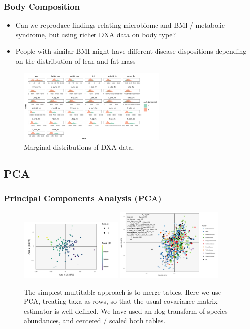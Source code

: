 \documentclass{beamer}
\begin{document}
\begin{frame}
  \frametitle{Body Composition}
  \begin{itemize}
  \item Can we reproduce findings relating microbiome and BMI / metabolic
    syndrome, but using richer DXA data on body type?
  \item People with similar BMI might have different disease dispositions
    depending on the distribution of lean and fat mass
  \end{itemize}
\begin{figure}[ht]
  \centering
  \includegraphics[width=0.65\textwidth]{figure/bc_histo}
  \caption{Marginal distributions of DXA data. \label{fig:bc_histo} }
\end{figure}
\end{frame}
\subsection{PCA}
\label{subsec:pca}

\begin{frame}
  \frametitle{Principal Components Analysis (PCA)}
  \begin{figure}[ht]
    \centering
    \includegraphics[width=0.45\textwidth]{figure/pca_scores_lm}
    \includegraphics[width=0.47\textwidth]{figure/pca_loadings}
    \caption{The simplest multitable approach is to merge tables. Here we use
      PCA, treating taxa as rows, so that the usual covariance matrix estimator
      is well defined. We have used an rlog transform of species abundances, and
      centered / scaled both tables. \label{fig:pca_multitable}}
  \end{figure}
\end{frame}
\end{document}
